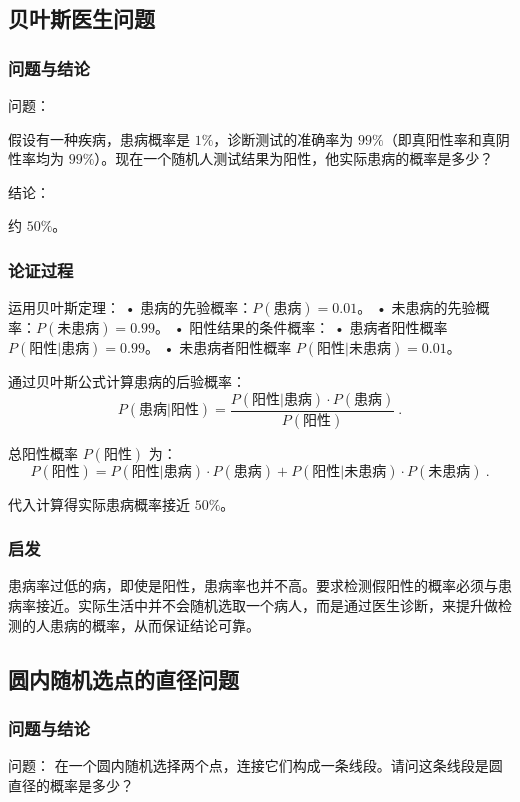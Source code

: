 \subsection{贝叶斯医生问题}

\subsubsection{问题与结论}

问题：

假设有一种疾病，患病概率是 $1\%$，诊断测试的准确率为 $99\%$（即真阳性率和真阴性率均为 $99\%$）。现在一个随机人测试结果为阳性，他实际患病的概率是多少？

结论：

约 $50\%$。

\subsubsection{论证过程}
    
运用贝叶斯定理：
	•	患病的先验概率：$P(\text{患病}) = 0.01$。
	•	未患病的先验概率：$P(\text{未患病}) = 0.99$。
	•	阳性结果的条件概率：
	•	患病者阳性概率 $P(\text{阳性}|\text{患病}) = 0.99$。
	•	未患病者阳性概率 $P(\text{阳性}|\text{未患病}) = 0.01$。

通过贝叶斯公式计算患病的后验概率：
$$
P(\text{患病}|\text{阳性}) = \frac{P(\text{阳性}|\text{患病}) \cdot P(\text{患病})}{P(\text{阳性})}~.
$$

总阳性概率 $P(\text{阳性})$ 为：
$$
P(\text{阳性}) = P(\text{阳性}|\text{患病}) \cdot P(\text{患病}) + P(\text{阳性}|\text{未患病}) \cdot P(\text{未患病})~.
$$

代入计算得实际患病概率接近 $50\%$。

\subsubsection{启发}

患病率过低的病，即使是阳性，患病率也并不高。要求检测假阳性的概率必须与患病率接近。实际生活中并不会随机选取一个病人，而是通过医生诊断，来提升做检测的人患病的概率，从而保证结论可靠。


\subsection{圆内随机选点的直径问题}

\subsubsection{问题与结论}
问题：
在一个圆内随机选择两个点，连接它们构成一条线段。请问这条线段是圆直径的概率是多少？

